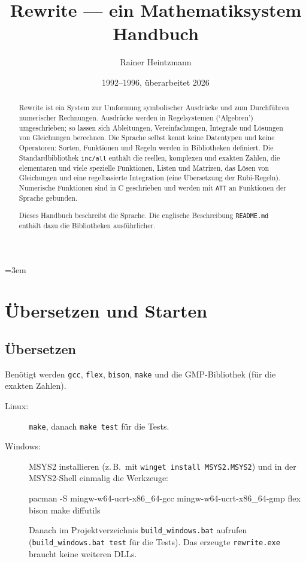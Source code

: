 \documentclass[a4paper,11pt]{article}
\title{Rewrite --- ein Mathematiksystem\\[0.5ex]\large Handbuch}
\author{Rainer Heintzmann}
\date{1992--1996, überarbeitet 2026}
\newcommand{\kw}[1]{\texttt{#1}}
\begin{document}
\emergencystretch=3em	%
\maketitle

\begin{abstract}
Rewrite ist ein System zur Umformung symbolischer Ausdrücke und zum
Durchführen numerischer Rechnungen. Ausdrücke werden in Regelsystemen
(`Algebren') umgeschrieben; so lassen sich Ableitungen, Vereinfachungen,
Integrale und Lösungen von Gleichungen berechnen. Die Sprache selbst kennt
keine Datentypen und keine Operatoren: Sorten, Funktionen und Regeln
werden in Bibliotheken definiert. Die Standardbibliothek \kw{inc/all}
enthält die reellen, komplexen und exakten Zahlen, die elementaren und
viele spezielle Funktionen, Listen und Matrizen, das Lösen von Gleichungen
und eine regelbasierte Integration (eine Übersetzung der Rubi-Regeln).
Numerische Funktionen sind in C geschrieben und werden mit \kw{ATT} an
Funktionen der Sprache gebunden.

Dieses Handbuch beschreibt die Sprache. Die englische Beschreibung
\kw{README.md} enthält dazu die Bibliotheken ausführlicher.
\end{abstract}

\tableofcontents

\section{Übersetzen und Starten}

\subsection{Übersetzen}
Benötigt werden \kw{gcc}, \kw{flex}, \kw{bison}, \kw{make} und die
GMP-Bibliothek (für die exakten Zahlen).
\begin{description}
\item[Linux:] \kw{make}, danach \kw{make test} für die Tests.
\item[Windows:] MSYS2 installieren (z.\,B.\ mit \kw{winget install
  MSYS2.MSYS2}) und in der MSYS2-Shell einmalig die Werkzeuge:
\begin{beispiel}
pacman -S mingw-w64-ucrt-x86_64-gcc mingw-w64-ucrt-x86_64-gmp flex bison make diffutils
\end{beispiel}
  Danach im Projektverzeichnis \kw{build\_windows.bat} aufrufen
  (\kw{build\_windows.bat test} für die Tests). Das erzeugte
  \kw{rewrite.exe} braucht keine weiteren DLLs.
\end{description}
\end{document}
